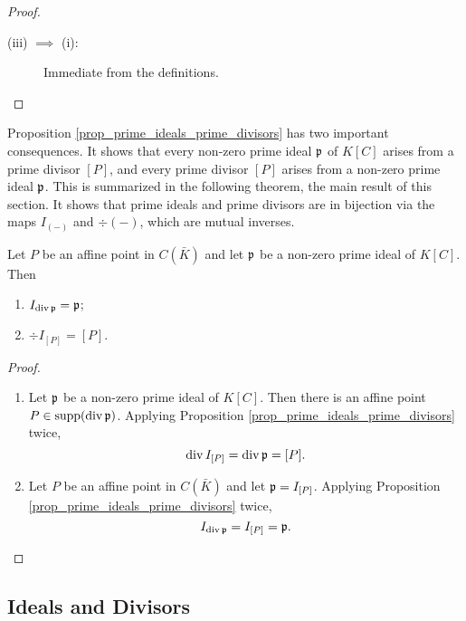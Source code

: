 \begin{proof}
\begin{description}
\begin{comment}
      Conversely, if $Q$ is not in the orbit of $P$, then $\frak p \neq I_{[Q]}$,
      so that $Q \not \in \supp(\div \frak p)$.
      By Lemma \ref{lem_order_is_1}, $P$ appears with multiplicity 1, so that $\div \frak p = [P]$.
\end{comment}
    \item [(iii) $\implies$ (i):]
      Immediate from the definitions.\qedhere
  \end{description}
\end{proof}

Proposition \ref{prop_prime_ideals_prime_divisors} has two important consequences.
It shows that every non-zero prime ideal $\frak p$ of $K[C]$ arises from a prime divisor $[P]$,
and every prime divisor $[P]$ arises from a non-zero prime ideal $\frak p$.
This is summarized in the following theorem, the main result of this section.
It shows that prime ideals and prime divisors are in bijection
via the maps $I_{(-)}$ and $\div(-)$, which are mutual inverses.

\begin{theorem}
  Let $P$ be an affine point in $C(\bar K)$ and let $\frak p$ be a non-zero prime ideal of $K[C]$. Then
  \begin{enumerate}[label=(\roman*)]
    \item $I_{\div \frak p} = \frak p$;
    \item $\div I_{[P]} = [P]$.
  \end{enumerate}
\end{theorem}
\begin{proof}
  \begin{enumerate}[label=(\roman*)]
    \item
      Let $\frak p$ be a non-zero prime ideal of $K[C]$.
      Then there is an affine point $P \in \supp(\div \frak p)$.
      Applying Proposition \ref{prop_prime_ideals_prime_divisors} twice,
      \[ \div I_{[P]} = \div \frak p = [P]. \]
    
    \item
      Let $P$ be an affine point in $C(\bar K)$ and let $\frak p = I_{[P]}$.
      Applying Proposition \ref{prop_prime_ideals_prime_divisors} twice,
      \[ I_{\div \frak p} = I_{[P]} = \frak p. \]
  \end{enumerate}
\end{proof}




\subsection{Ideals and Divisors}

